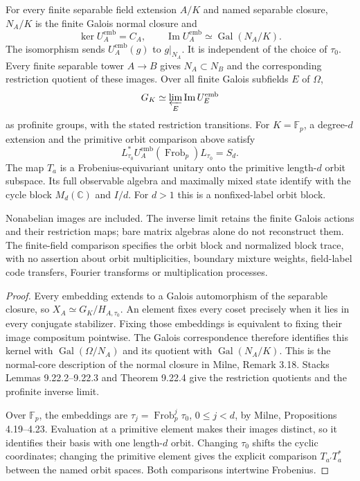 \begin{theorem}
\statusProved\quad
For every finite separable field extension $A/K$ and named separable
closure, $N_A/K$ is the finite Galois normal closure and
\[
 \ker U_A^{\mathrm{emb}}=C_A,\qquad
 \operatorname{Im}U_A^{\mathrm{emb}}\simeq\operatorname{Gal}(N_A/K).
\]
The isomorphism sends $U_A^{\mathrm{emb}}(g)$ to $g|_{N_A}$. It is
independent of the choice of $\tau_0$. Every finite separable tower
$A\to B$ gives $N_A\subset N_B$ and the corresponding restriction
quotient of these images. Over all finite Galois subfields $E$ of $\Omega$,
\[
 G_K\simeq\varprojlim_E\operatorname{Im}U_E^{\mathrm{emb}}
\]
as profinite groups, with the stated restriction transitions.
For $K=\mathbb F_p$, a degree-$d$ extension and the primitive orbit
comparison above satisfy
\[
 L_{\tau_0}^*U_A^{\mathrm{emb}}(\operatorname{Frob}_p)L_{\tau_0}=S_d.
\]
The map $T_a$ is a Frobenius-equivariant unitary onto the primitive
length-$d$ orbit subspace. Its full observable algebra and maximally mixed
state identify with the cycle block $M_d(\mathbb C)$ and $I/d$.
For $d>1$ this is a nonfixed-label orbit block.
\end{theorem}
\begin{scope}
Nonabelian images are included. The inverse limit retains the finite
Galois actions and their restriction maps; bare matrix algebras alone do
not reconstruct them. The finite-field comparison specifies the orbit
block and normalized block trace, with no assertion about orbit
multiplicities, boundary mixture weights, field-label code transfers,
Fourier transforms or multiplication processes.
\end{scope}

\begin{proof}
Every embedding extends to a Galois automorphism of the separable closure,
so $X_A\simeq G_K/H_{A,\tau_0}$. An element fixes every coset precisely
when it lies in every conjugate stabilizer. Fixing those embeddings is
equivalent to fixing their image compositum pointwise. The Galois
correspondence therefore identifies this kernel with
$\operatorname{Gal}(\Omega/N_A)$ and its quotient with
$\operatorname{Gal}(N_A/K)$. This is the normal-core description of the
normal closure in Milne, Remark 3.18. Stacks Lemmas 9.22.2--9.22.3 and
Theorem 9.22.4 give the restriction quotients and the profinite inverse limit.

Over $\mathbb F_p$, the embeddings are
$\tau_j=\operatorname{Frob}_p^j\tau_0$, $0\leq j<d$, by Milne,
Propositions 4.19--4.23. Evaluation at a primitive element makes their
images distinct, so it identifies their basis with one length-$d$ orbit.
Changing $\tau_0$ shifts the cyclic coordinates; changing the primitive
element gives the explicit comparison $T_{a'}T_a^*$ between the named
orbit spaces. Both comparisons intertwine Frobenius.
\end{proof}

